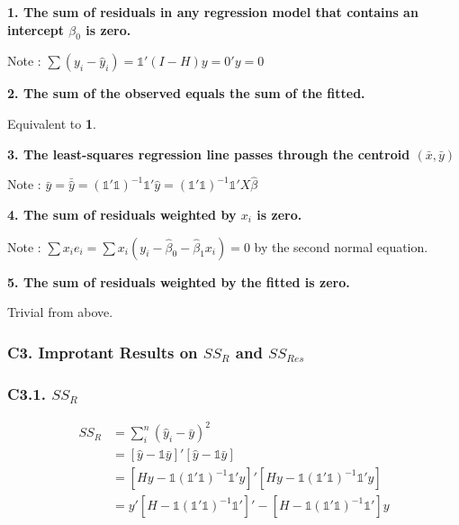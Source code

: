 \documentclass[12pt]{article}
\begin{document}
\textbf{1. The sum of residuals in any regression model that contains an intercept $\beta_0$ is zero.}

Note : $\sum (y_i - \hat{y}_i) = \mathds{1}' (I - H) y = 0' y = 0 $

\bigskip

\textbf{2. The sum of the observed equals the sum of the fitted.}

Equivalent to \textbf{1}.

\bigskip

\textbf{3. The least-squares regression line passes through the \textbf{centroid} $(\bar{x}, \bar{y})$ }

Note : $\bar{y} = \bar{\hat{y}} = (\mathds{1}' \mathds{1})^{-1} \mathds{1}' \hat{y} = (\mathds{1}' \mathds{1})^{-1} \mathds{1}' X \hat{\beta}$

\bigskip

\textbf{4. The sum of residuals weighted by $x_i$ is zero.}

Note : $\sum x_i e_i = \sum x_i (y_i - \hat{\beta}_0 - \hat{\beta}_1 x_i) = 0 $ by the second normal equation.

\bigskip

\textbf{5. The sum of residuals weighted by the fitted is zero.}

Trivial from above.





\subsubsection*{C3. Improtant Results on $SS_R$ and $SS_{Res}$} %


\subsubsection*{C3.1. $SS_R$}

$$
\begin{aligned}
SS_R &= \sum_i^n (\hat{y}_i - \bar{y})^2 \\
&= [\hat{y} - \mathds{1} \bar{y}]' [\hat{y} - \mathds{1} \bar{y}] \\
&= [Hy - \mathds{1} (\mathds{1}' \mathds{1})^{-1} \mathds{1} ' y]' [Hy -  \mathds{1} (\mathds{1}' \mathds{1})^{-1} \mathds{1} ' y] \\
&= y' [H - \mathds{1} (\mathds{1}' \mathds{1})^{-1} \mathds{1} ']' - [H - \mathds{1} (\mathds{1}' \mathds{1})^{-1} \mathds{1} '] y
\end{aligned}
$$
\end{document}
